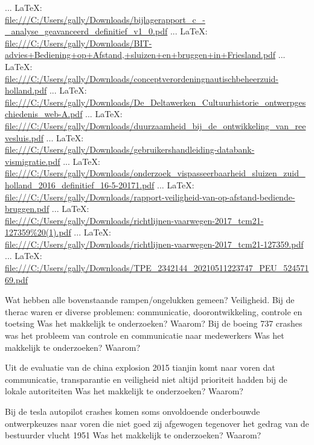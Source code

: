 \begin{thebibliography}{99}
{{ ... \LaTeX:\\ \url{file:///C:/Users/gally/Downloads/bijlagerapport_c_-_analyse_geavanceerd_definitief_v1_0.pdf}
 ... \LaTeX:\\ \url{file:///C:/Users/gally/Downloads/BIT-advies+Bediening+op+Afstand,+sluizen+en+bruggen+in+Friesland.pdf}
 ... \LaTeX:\\ \url{file:///C:/Users/gally/Downloads/conceptverordeningnautischbeheerzuid-holland.pdf}
 ... \LaTeX:\\ \url{file:///C:/Users/gally/Downloads/De_Deltawerken_Cultuurhistorie_ontwerpgeschiedenis_web-A.pdf}
 ... \LaTeX:\\ \url{file:///C:/Users/gally/Downloads/duurzaamheid_bij_de_ontwikkeling_van_reevesluis.pdf}
 ... \LaTeX:\\ \url{file:///C:/Users/gally/Downloads/gebruikershandleiding-databank-vismigratie.pdf}
 ... \LaTeX:\\ \url{file:///C:/Users/gally/Downloads/onderzoek_vispasseerbaarheid_sluizen_zuid_holland_2016_definitief_16-5-20171.pdf}
 ... \LaTeX:\\ \url{file:///C:/Users/gally/Downloads/rapport-veiligheid-van-op-afstand-bediende-bruggen.pdf}
 ... \LaTeX:\\ \url{file:///C:/Users/gally/Downloads/richtlijnen-vaarwegen-2017_tcm21-127359%20(1).pdf}
 ... \LaTeX:\\ \url{file:///C:/Users/gally/Downloads/richtlijnen-vaarwegen-2017_tcm21-127359.pdf}
 ... \LaTeX:\\ \url{file:///C:/Users/gally/Downloads/TPE_2342144_20210511223747_PEU_52457169.pdf}


Wat hebben alle bovenstaande rampen/ongelukken gemeen? Veiligheid.
Bij de therac waren er diverse problemen: communicatie, doorontwikkeling, controle en toetsing
Was het makkelijk te onderzoeken? Waarom?
Bij de boeing 737 crashes was het probleem van controle en communicatie naar medewerkers
Was het makkelijk te onderzoeken? Waarom?

Uit de evaluatie van de china explosion 2015 tianjin komt naar voren dat communicatie, transparantie en veiligheid niet altijd prioriteit hadden bij de lokale autoriteiten
Was het makkelijk te onderzoeken? Waarom?

Bij de tesla autopilot crashes komen soms onvoldoende onderbouwde ontwerpkeuzes naar voren die niet goed zij  afgewogen tegenover het gedrag van de bestuurder
vlucht 1951
Was het makkelijk te onderzoeken? Waarom?

}}
\end{thebibliography}
